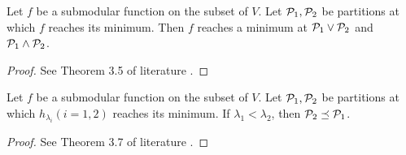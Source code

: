 \begin{lemma}\label{thm:lattice_structure}
Let $f$ be a submodular function on the subset of $V$. Let $\P_1, \P_2$ be partitions
at which $f$ reaches its minimum. Then $f$ reaches a minimum at $\P_1 \vee \P_2$ and $\P_1 \wedge \P_2$.
\end{lemma}
\begin{proof}
See Theorem 3.5 of literature \cite{psp}.	
\end{proof}
\begin{lemma}\label{thm:hierarchical}
Let $f$ be a submodular function on the subset of $V$. Let $\P_1, \P_2$ be partitions
at which $h_{\lambda_i}(i=1,2)$ reaches its minimum. 
If $\lambda_1 < \lambda_2$, then $\P_2 \preceq \P_1$.
\end{lemma}
\begin{proof}
	See Theorem 3.7 of literature \cite{psp}.	
\end{proof}
